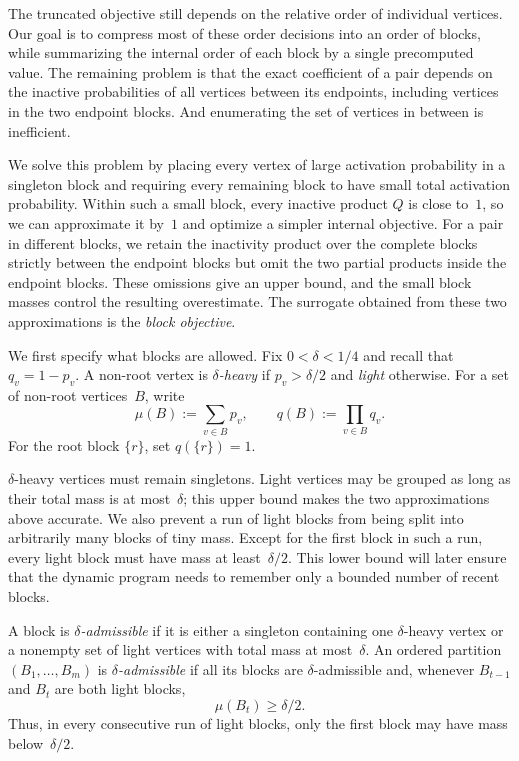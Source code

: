\documentclass[12pt,a4paper,oneside]{report}
\begin{document}
The truncated objective still depends on the relative order of individual
vertices.  Our goal is to compress most of these order decisions into an
order of blocks, while summarizing the internal order of each block by a
single precomputed value.  The remaining problem is that the exact coefficient of a
pair depends on the inactive probabilities of all vertices between its
endpoints, including vertices in the two endpoint blocks. And enumerating the set
of vertices in between is inefficient.

We solve this problem by placing every vertex of large activation
probability in a singleton block and requiring every remaining block to have
small total activation probability.  Within such a small block, every
inactive product $Q$ is close to~$1$, so we can approximate it by~$1$ and optimize a
simpler internal objective.  For a pair in different blocks, we retain the
inactivity product over the complete blocks strictly between the endpoint
blocks but omit the two partial products inside the endpoint blocks.  These
omissions give an upper bound, and the small block masses control the resulting
overestimate.  The
surrogate obtained from these two approximations is the \emph{block
objective}.

We first specify what blocks are allowed.  Fix $0<\delta<1/4$ and recall
that $q_v=1-p_v$.  A non-root vertex is \emph{$\delta$-heavy} if
$p_v>\delta/2$ and \emph{light} otherwise.  For a set of non-root
vertices~$B$, write
\[
    \mu(B):=\sum_{v\in B}p_v,
    \qquad
    q(B):=\prod_{v\in B}q_v.
\]
For the root block $\{r\}$, set $q(\{r\})=1$.

$\delta$-heavy vertices must remain singletons.  Light vertices may be grouped as long
as their total mass is at most~$\delta$; this upper bound makes the two
approximations above accurate.  We also prevent a run of light blocks from
being split into arbitrarily many blocks of tiny mass.  Except for the first
block in such a run, every light block must have mass at least~$\delta/2$.
This lower bound will later ensure that the dynamic program needs to remember
only a bounded number of recent blocks.

\begin{samepage}
\begin{definition}\label{def:admissible-partition}
A block is \emph{$\delta$-admissible} if it is either a singleton containing one $\delta$-heavy
vertex or a nonempty set of light vertices with total mass at most~$\delta$.
An ordered partition $(B_1,\dots,B_m)$ is \emph{$\delta$-admissible} if all its blocks are
$\delta$-admissible and, whenever $B_{t-1}$ and $B_t$ are both light blocks,
\[
    \mu(B_t)\ge\delta/2.
\]
Thus, in every consecutive run of light blocks, only the first block may have
mass below~$\delta/2$.
\end{definition}
\end{samepage}
\end{document}

